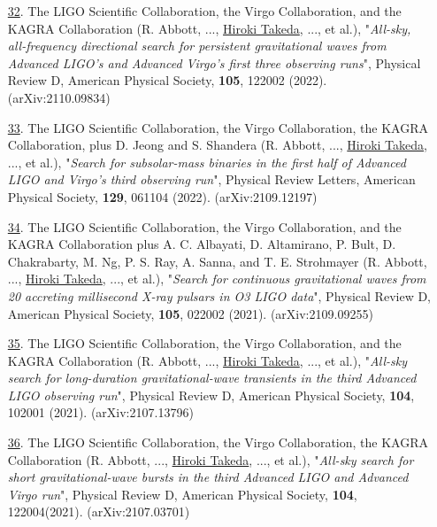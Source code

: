 \documentclass[uplatex, 12pt]{article}
\begin{document}
\begin{enumerate}
\item[\uline{32}.] The LIGO Scientific Collaboration, the Virgo Collaboration, and the KAGRA Collaboration (R. Abbott, ..., \uline{Hiroki Takeda}, ..., et al.), "\emph{All-sky, all-frequency directional search for persistent gravitational waves from Advanced LIGO's and Advanced Virgo's first three observing runs}", Physical Review D, American Physical Society, {\bf 105}, 122002 (2022). (arXiv:2110.09834)\\

\item[\uline{33}.] The LIGO Scientific Collaboration, the Virgo Collaboration, the KAGRA Collaboration, plus D. Jeong and S. Shandera (R. Abbott, ..., \uline{Hiroki Takeda}, ..., et al.), "\emph{Search for subsolar-mass binaries in the first half of Advanced LIGO and Virgo's third observing run}", Physical Review Letters, American Physical Society, {\bf 129}, 061104 (2022). (arXiv:2109.12197)\\

\item[\uline{34}.] The LIGO Scientific Collaboration, the Virgo Collaboration, and the KAGRA Collaboration plus A. C. Albayati, D. Altamirano, P. Bult, D. Chakrabarty, M. Ng, P. S. Ray, A. Sanna, and T. E. Strohmayer (R. Abbott, ..., \uline{Hiroki Takeda}, ..., et al.), "\emph{Search for continuous gravitational waves from 20 accreting millisecond X-ray pulsars in O3 LIGO data}", Physical Review D, American Physical Society, {\bf 105}, 022002 (2021). (arXiv:2109.09255)\\

\item[\uline{35}.] The LIGO Scientific Collaboration, the Virgo Collaboration, and the KAGRA Collaboration (R. Abbott, ..., \uline{Hiroki Takeda}, ..., et al.), "\emph{All-sky search for long-duration gravitational-wave transients in the third Advanced LIGO observing run}", Physical Review D, American Physical Society, {\bf 104}, 102001 (2021). (arXiv:2107.13796)\\

\item[\uline{36}.] The LIGO Scientific Collaboration, the Virgo Collaboration, the KAGRA Collaboration (R. Abbott, ..., \uline{Hiroki Takeda}, ..., et al.), "\emph{All-sky search for short gravitational-wave bursts in the third Advanced LIGO and Advanced Virgo run}", Physical Review D, American Physical Society, {\bf 104}, 122004(2021). (arXiv:2107.03701)\\


\end{enumerate}
\end{document}
